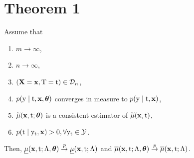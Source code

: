 \section{Theorem 1}
\label{app:sharpness}
Assume that 
\begin{enumerate}
    \item $m \to \infty$, \label{ass:m}
    \item $n \to \infty$, \label{ass:n}
    \item $(\mathbf{X}=\mathbf{x}, \mathrm{T}=\mathrm{t}) \in \mathcal{D}_n$, \label{ass:data}
    \item $p(\mathrm{y} \mid \mathrm{t}, \mathbf{x}, \bm{\theta})$ converges in measure to $p(\mathrm{y} \mid \mathrm{t}, \mathbf{x})$, \label{ass:measure}
    \item $\widetilde{\mu}(\mathbf{x}, \mathrm{t}; \bm{\theta})$ is a consistent estimator of $\widetilde{\mu}(\mathbf{x}, \mathrm{t})$, \label{ass:prob}
    \item $p(\mathrm{t} \mid \mathrm{y}_{\mathrm{t}}, \mathbf{x}) > 0, \forall \mathrm{y}_{\mathrm{t}} \in \mathcal{Y}$. \label{ass:pos}
\end{enumerate}
Then, $\underline{\mu}(\mathbf{x}, \mathrm{t}; \Lambda, \bm{\theta}) \overset{p}{\to} \underline{\mu}(\mathbf{x}, \mathrm{t}; \Lambda)$ and $\overline{\mu}(\mathbf{x}, \mathrm{t}; \Lambda, \bm{\theta}) \overset{p}{\to} \overline{\mu}(\mathbf{x}, \mathrm{t}; \Lambda)$.
